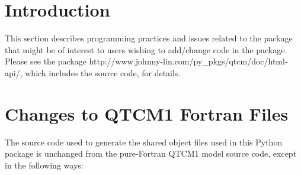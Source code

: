 %


%

\section{Introduction}

This section describes programming practices and issues related to
the  package that might be of interest to users wishing
to add/change code in the package.
Please see the package
%
        {%
		{http://www.johnny-lin.com/py\_pkgs/qtcm/doc/html-api/},
		which includes the source code},
for details.




\section{Changes to QTCM1 Fortran Files}  \label{sec:f90changes}

The source code used to generate the shared object files used
in this Python package is unchanged
from the pure-Fortran QTCM1 model source code, except in the
following ways:

